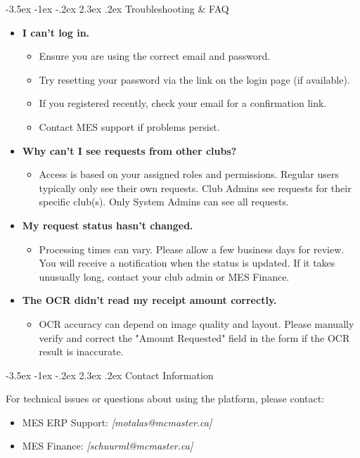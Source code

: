 \documentclass{article}
\makeatletter
\renewcommand \section{\clearpage\@startsection {section}{1}{\z@}%
                                   {-3.5ex \@plus -1ex \@minus -.2ex}%
                                   {2.3ex \@plus.2ex}%
                                   {\normalfont\Large\bfseries}}
\makeatother
\begin{document}
\section{Troubleshooting \& FAQ}

\begin{itemize}
    \item \textbf{I can't log in.}
        \begin{itemize}
            \item Ensure you are using the correct email and password.
            \item Try resetting your password via the link on the login page (if available).
            \item If you registered recently, check your email for a confirmation link.
            \item Contact MES support if problems persist.
        \end{itemize}
    \item \textbf{Why can't I see requests from other clubs?}
        \begin{itemize}
            \item Access is based on your assigned roles and permissions. Regular users typically only see their own requests. Club Admins see requests for their specific club(s). Only System Admins can see all requests.
        \end{itemize}
    \item \textbf{My request status hasn't changed.}
        \begin{itemize}
            \item Processing times can vary. Please allow a few business days for review. You will receive a notification when the status is updated. If it takes unusually long, contact your club admin or MES Finance.
        \end{itemize}
    \item \textbf{The OCR didn't read my receipt amount correctly.}
        \begin{itemize}
            \item OCR accuracy can depend on image quality and layout. Please manually verify and correct the "Amount Requested" field in the form if the OCR result is inaccurate.
        \end{itemize}
\end{itemize}

\section{Contact Information}

For technical issues or questions about using the \progname{} platform, please contact:
\begin{itemize}
    \item MES ERP Support: \textit{[motalas@mcmaster.ca]}
    \item MES Finance: \textit{[schuurml@mcmaster.ca]}
\end{itemize}

\end{document}
